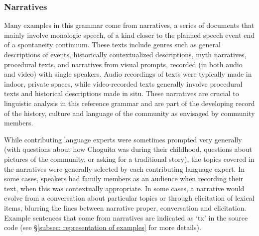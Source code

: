 \subsubsection{Narratives}
\label{subsubsec: narratives}

Many examples in this grammar come from narratives, a series of documents that mainly involve monologic speech, of a kind closer to the planned speech event end of a spontaneity continuum. These texts include genres such as general descriptions of events, historically contextualized descriptions, myth narratives, procedural texts, and narratives from visual prompts, recorded (in both audio and video) with single speakers.
Audio recordings of texts were typically made in indoor, private spaces, while video-recorded texts generally involve procedural texts and historical descriptions made in situ. These narratives are crucial to linguistic analysis in this reference grammar and are part of the developing record of the history, culture and language of the community as envisaged by community members.

While contributing language experts were sometimes prompted very generally (with questions about how Choguita was during their childhood, questions about pictures of the community, or asking for a traditional story), the topics covered in the narratives were generally selected by each contributing language expert. In some cases, speakers had family members as an audience when recording their text, when this was contextually appropriate. In some cases, a narrative would evolve from a conversation about particular topics or through elicitation of lexical items, blurring the lines between narrative proper, conversation and elicitation. Example sentences that come from narratives are indicated as `tx' in the source code (see §\ref{subsec: representation of examples} for more details).

